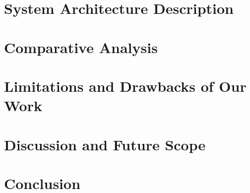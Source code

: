 \documentclass[journal]{IEEEtran}
\begin{document}
\section{System Architecture Description}
\label{sec:architecture}

\section{Comparative Analysis}
\label{sec:comparative_analysis}

\section{Limitations and Drawbacks of Our Work}
\label{sec:limitations}

\section{Discussion and Future Scope}
\label{sec:discussion}

\section{Conclusion}
\label{sec:conclusion}



\end{document}
